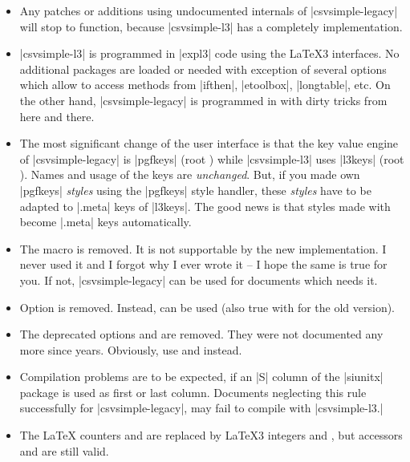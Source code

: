 \documentclass[a4paper,11pt]{ltxdoc}
\begin{document}
\begin{itemize}
\item Any patches or additions using undocumented internals of |csvsimple-legacy|
  will stop to function, because |csvsimple-l3| has a completely implementation.
\item |csvsimple-l3| is programmed in |expl3| code using the \LaTeX3 interfaces.
  No additional packages are loaded or needed with exception of several options
  which allow to access methods from |ifthen|, |etoolbox|, |longtable|, etc.
  On the other hand, |csvsimple-legacy| is programmed in \LaTeXe{} with
  dirty tricks from here and there.
\item The most significant change of the user interface is that the key value
  engine of |csvsimple-legacy| is |pgfkeys| (root \docAuxKey*[csv]{}) while |csvsimple-l3| uses
  |l3keys| (root \docAuxKey*[csvsim]{}).
  Names and usage of the keys are \emph{unchanged}.
  But, if
  you made own |pgfkeys| \emph{styles} using the |pgfkeys| style handler,
  these \emph{styles} have to be adapted to |.meta| keys of |l3keys|.
  The good news is that styles
  made with  become |.meta| keys automatically.
\item The macro  is removed. It is not supportable
  by the new implementation. I never used it and I forgot why I ever wrote it
  -- I hope the same is true for you. If not, |csvsimple-legacy| can be
  used for documents which needs it.
\item Option  is removed. Instead, 
  can be used (also true with  for the old version).
\item The deprecated options
   and  are removed.
  They were not documented any more since years. Obviously, use
   and  instead.
\item Compilation problems are to be expected, if an |S| column of the |siunitx| package
  is used as first or last column. Documents neglecting this rule successfully
  for |csvsimple-legacy|, may fail to compile with |csvsimple-l3.|
\item The \LaTeX{} counters 
  and 
  are replaced by \LaTeX3 integers
  and , but accessors
   and
   are still valid.

\end{itemize}
\end{document}

